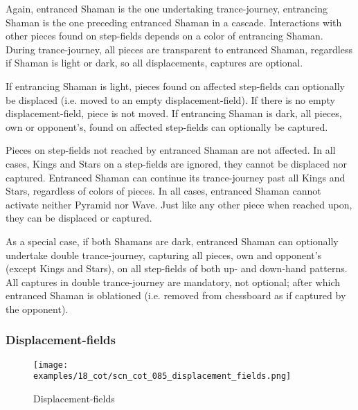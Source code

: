Again, entranced Shaman is the one undertaking trance-journey, entrancing Shaman
is the one preceding entranced Shaman in a cascade. Interactions with other pieces
found on step-fields depends on a color of entrancing Shaman. During trance-journey,
all pieces are transparent to entranced Shaman, regardless if Shaman is light or
dark, so all displacements, captures are optional.

If entrancing Shaman is light, pieces found on affected step-fields can optionally
be displaced (i.e. moved to an empty displacement-field). If there is no empty
displacement-field, piece is not moved.\newline
\indent
If entrancing Shaman is dark, all pieces, own or opponent's, found on affected
step-fields can optionally be captured.

Pieces on step-fields not reached by entranced Shaman are not affected. In all
cases, Kings and Stars on a step-fields are ignored, they cannot be displaced
nor captured. Entranced Shaman can continue its trance-journey past all Kings
and Stars, regardless of colors of pieces.\newline
\indent
In all cases, entranced Shaman cannot activate neither Pyramid nor Wave. Just
like any other piece when reached upon, they can be displaced or captured.

As a special case, if both Shamans are dark, entranced Shaman can optionally
undertake double trance-journey, capturing all pieces, own and opponent's
(except Kings and Stars), on all step-fields of both up- and down-hand patterns.
All captures in double trance-journey are mandatory, not optional; after which
entranced Shaman is oblationed (i.e. removed from chessboard as if captured
by the opponent).


\subsubsection*{Displacement-fields}
\label{sec:Conquest of Tlalocan/Trance-journey/Interactions/Displacement-fields}

\vspace*{-1.5\baselineskip}
\noindent
\begin{figure}[!h]
\texttt{[image: examples/18\_cot/scn\_cot\_085\_displacement\_fields.png]}
\caption{Displacement-fields}
\label{fig:scn_cot_085_displacement_fields}
\end{figure}

